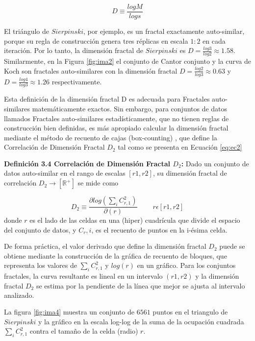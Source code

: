 \begin{equation}
D \equiv \frac{log M}{log s}
\label{eq:ec1}
\end{equation}

El triángulo de $Sierpinski$, por ejemplo, es un fractal exactamente auto-similar, porque su regla de construcción genera tres réplicas en escala $1:2$ en cada iteración. Por lo tanto, la dimensión fractal de $Sierpinski$ es $D = \frac{log 3}{log 2} \approx 1.58$. Similarmente, en la Figura \ref{fig:ima2}
el conjunto de Cantor conjunto y la curva de Koch son  fractales auto-similares con la dimensión fractal $ D = \frac{log2}{log3} \approx 0.63$ y $ D = \frac{log4}{log3} \approx 1.26$ respectivamente.

Esta definición de la dimensión fractal D es adecuada para Fractales  auto-similares matemáticamente  exactos. Sin embargo, para conjuntos de datos llamados  Fractales auto-similares estadísticamente, que no tienen reglas de construcción bien definidas, es más apropiado  calcular la dimensión fractal mediante el método de recuento de cajas (box-counting) \cite{Schroeder:1991}, que define la Correlación de Dimensión Fractal   $D_2$ tal como se presenta en Ecuación \ref{eq:ec2}

\textbf{Definición 3.4 Correlación de Dimensión Fractal $D_2$:} Dado un conjunto de datos auto-similar en el rango de escalas $[r1, r2]$, su dimensión fractal de correlación $D_2 \rightarrow \left[ \mathbb{R}^{+} \right]$ se mide como

\begin{equation}
D_2 \equiv  \frac{\partial log (\sum_i C_{r,1}^2)}{\partial (r)} \qquad \:r \epsilon [r1,r2 ]
\label{eq:ec2}
\end{equation}
donde $r$ es el lado de las celdas en una (hiper) cuadrícula  que divide el espacio del  conjunto de datos, y $C_r,i$, es el recuento de puntos en la i-ésima celda.

De forma práctica, el valor derivado que define la dimensión fractal $D_2$ puede se obtiene mediante la construcción de la gráfica de recuento de bloques, que representa los valores de $\sum_i C_{r,1}^2$  y $log (r)$ en un gráfico. Para los conjuntos fractales, la curva resultante es lineal en un intervalo $(r1, r2)$ y la dimensión fractal $D_2$ se estima por la pendiente de la línea que mejor se ajusta al intervalo analizado.

La figura \ref{fig:ima4} muestra un conjunto de $6561$ puntos en el triangulo de $Sierpinski$  y la gráfico en la escala log-log de la suma de la ocupación cuadrada $\sum_i C_{r,1}^2$ contra el tamaño de la celda  (radio) $r$.


